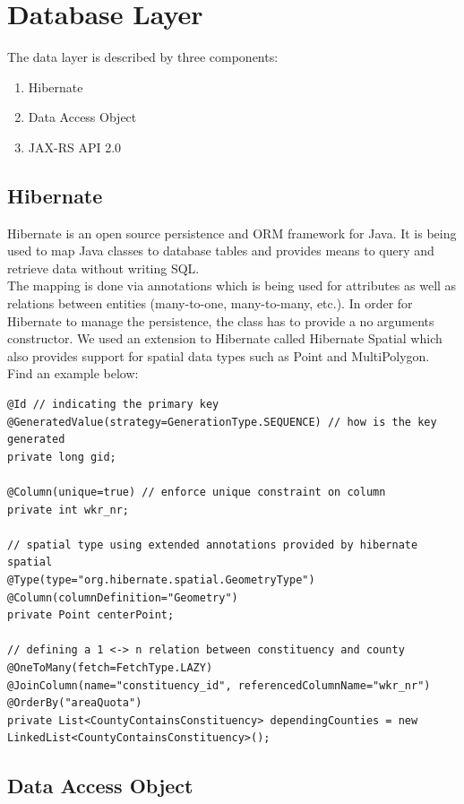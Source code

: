 
\section{Database Layer}
The data layer is described by three components:
\begin{enumerate}
\def\labelenumi{\arabic{enumi}.}
\itemsep1pt\parskip0pt
\item
  Hibernate
\item
  Data Access Object
\item
  JAX-RS API 2.0
\end{enumerate}

\subsection{Hibernate}\label{hibernate}

Hibernate is an open source persistence and ORM framework for Java. It
is being used to map Java classes to database tables and provides means
to query and retrieve data without writing SQL.\\The mapping is done via
annotations which is being used for attributes as well as relations
between entities (many-to-one, many-to-many, etc.). In order for
Hibernate to manage the persistence, the class has to provide a no
arguments constructor. We used an extension to Hibernate called
Hibernate Spatial which also provides support for spatial data types
such as Point and MultiPolygon. Find an example below:


\begin{lstlisting}
@Id // indicating the primary key
@GeneratedValue(strategy=GenerationType.SEQUENCE) // how is the key generated
private long gid;

@Column(unique=true) // enforce unique constraint on column
private int wkr_nr;

// spatial type using extended annotations provided by hibernate spatial
@Type(type="org.hibernate.spatial.GeometryType")
@Column(columnDefinition="Geometry")
private Point centerPoint;

// defining a 1 <-> n relation between constituency and county
@OneToMany(fetch=FetchType.LAZY)
@JoinColumn(name="constituency_id", referencedColumnName="wkr_nr")
@OrderBy("areaQuota")
private List<CountyContainsConstituency> dependingCounties = new LinkedList<CountyContainsConstituency>();
\end{lstlisting}

\newpage
\subsection{Data Access Object}\label{data-access-object}

